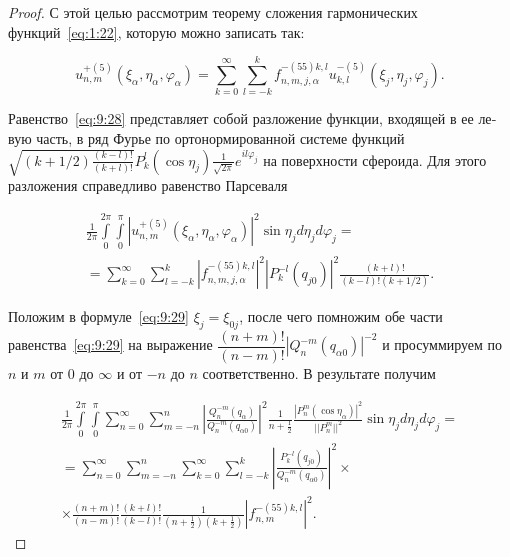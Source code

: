 \begin{russian}
\begin{proof}
С этой целью рассмотрим теорему сложения гармонических функций~\eqref{eq:1:22}, которую можно записать так:

\begin{equation}
u_{n,m}^{ + (5)}\left( {{\xi _{\alpha}},{\eta _{\alpha}},{\varphi _{\alpha}}} \right) = \sum\limits_{k = 0}^\infty\sum\limits_{l=-k}^k f_{n,m,j,\alpha}^{-(55)k,l} u_{k,l}^{ - (5)}\left( {{\xi _j},{\eta _j},{\varphi _j}} \right).
\label{eq:9:28}
\end{equation}

Равенство~\eqref{eq:9:28} представляет собой разложение функции, входящей в ее левую часть, в ряд Фурье по ортонормированной системе функций $\sqrt {(k + 1/2)\frac{{(k - l)!}}{{(k + l)!}}} P_k^l(\cos {\eta _j})\frac{1}{{\sqrt {2\pi } }}{e^{il{\varphi _j}}}$ на поверхности сфероида. Для этого разложения справедливо равенство Парсеваля\sloppy

\begin{multline}
\frac{1}{{2\pi }}\int\limits_0^{2\pi } {\int\limits_0^\pi  {{{\left| {u_{n,m}^{ + (5)}\left( {{\xi _{\alpha}},{\eta _{\alpha}},{\varphi _{\alpha}}} \right)} \right|}^2}} } \sin {\eta _j}d{\eta _j}d{\varphi _j} = \\
= \sum\limits_{k = 0}^\infty  {\sum\limits_{l =  - k}^k {{{\left| {f_{n,m,j,\alpha}^{-(55)k,l}} \right|}^2}} } {\left| {P_k^{ - l}({q_{j0}})} \right|^2}\frac{{(k + l)!}}{{(k - l)!(k + 1/2)}}.
\label{eq:9:29}
\end{multline}

Положим в формуле~\eqref{eq:9:29} $\xi_j=\xi_{0j}$, после чего помножим обе части равенства~\eqref{eq:9:29} на выражение $\dfrac{{(n + m)!}}{{(n - m)!}}{{{{\left| {Q_n^{ - m}\left( {{q _{\alpha 0}}} \right)} \right|}^{-2}}}}$ и просуммируем по $n$ и $m$ от $0$ до $\infty$ и от $-n$ до $n$ соответственно. В результате получим

\begin{multline}
\frac{1}{{2\pi }}\int\limits_0^{2\pi } {\int\limits_0^\pi  {\sum\limits_{n = 0}^\infty  {\sum\limits_{m =  - n}^n {{{\left| {\frac{{Q_n^{ - m}\left( {{q _{\alpha}}} \right)}}{{Q_n^{ - m}\left( {{q _{\alpha 0}}} \right)}}} \right|}^2}} } } } \frac{1}{{n + \frac{1}{2}}}\frac{{{{\left| {P_n^m(\cos {\eta _{\alpha}})} \right|}^2}}}{{||P_n^m|{|^2}}}\sin {\eta _j}d{\eta _j}d{\varphi _j} = \\
= \sum\limits_{n = 0}^\infty  {\sum\limits_{m =  - n}^n {\sum\limits_{k = 0}^\infty  {\sum\limits_{l =  - k}^k {{{\left| {\frac{{P_k^{ - l}({q_{j0}})}}{{Q_n^{ - m}\left( {{q _{\alpha 0}}} \right)}}} \right|}^2}} } } } \times \\
\times\frac{{(n + m)!}}{{(n - m)!}}\frac{{(k + l)!}}{{(k - l)!}}\frac{1}{{\left( {n + \frac{1}{2}} \right)\left( {k + \frac{1}{2}} \right)}}{\left| {f_{n,m}^{-(55)k,l}} \right|^2}.
\label{eq:9:30}
\end{multline}


\end{proof}
\end{russian}
